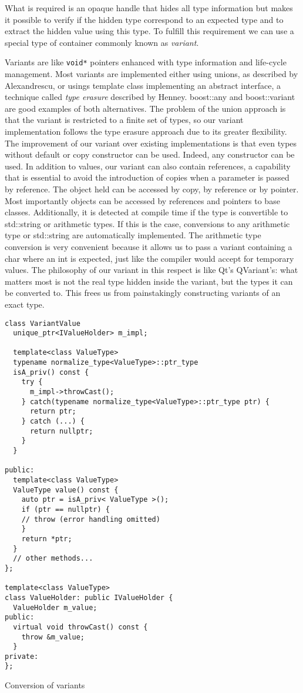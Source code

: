What is required is an opaque handle that hides all type information but makes it possible to verify if the hidden type correspond to an
expected type and to extract the hidden value using this type. To fulfill this requirement we can use a special type of container
commonly known as \emph{variant}.

Variants are like \texttt{void*} pointers enhanced with type information and life-cycle management.
Most variants are implemented either using unions, as described by Alexandrescu\cite{alexunions}, or usings template class implementing
an abstract interface, a technique called \emph{type erasure} \cite{becker} described by Henney\cite{henney}. boost::any and boost::variant\cite{boost}
are good examples of both alternatives. The problem of the union approach is that the variant is restricted to a finite set of types, so our variant
implementation follows the type erasure approach due to its greater flexibility. The improvement of our variant over existing implementations
is that even types without default or copy constructor can be used. Indeed, any constructor can be used. In addition to values, our variant
can also contain references, a capability that is essential to avoid the introduction of copies when a parameter is passed by reference.
The object held can be accessed by copy, by reference or by pointer. Most importantly objects can be accessed by references and pointers to
base classes. Additionally, it is detected at compile time if the type is convertible to std::string or arithmetic types. If this is the
case, conversions to any arithmetic type or std::string are automatically implemented. The arithmetic type conversion is very convenient
because it allows us to pass a variant containing a char where an int is expected, just like the compiler would accept for temporary values.
The philosophy of our variant in this respect is like Qt's QVariant's\cite{qt}: what matters most is not the real type hidden inside the
variant, but the types it can be converted to. This frees us from painstakingly constructing variants of an exact type.

\begin{listing}[H]
\begin{verbatim}
class VariantValue
  unique_ptr<IValueHolder> m_impl;
  
  template<class ValueType>
  typename normalize_type<ValueType>::ptr_type 
  isA_priv() const {
    try {
      m_impl->throwCast();
    } catch(typename normalize_type<ValueType>::ptr_type ptr) {
      return ptr;
    } catch (...) {
      return nullptr;
    }
  }
  
public:
  template<class ValueType>
  ValueType value() const {
    auto ptr = isA_priv< ValueType >();
    if (ptr == nullptr) {
	// throw (error handling omitted)
    }
    return *ptr;
  }
  // other methods...
};

template<class ValueType>
class ValueHolder: public IValueHolder {
  ValueHolder m_value;
public:
  virtual void throwCast() const {
    throw &m_value;
  }
private:	
};
\end{verbatim}
\caption{Conversion of variants}
\label{lst:listing11}
\end{listing}

